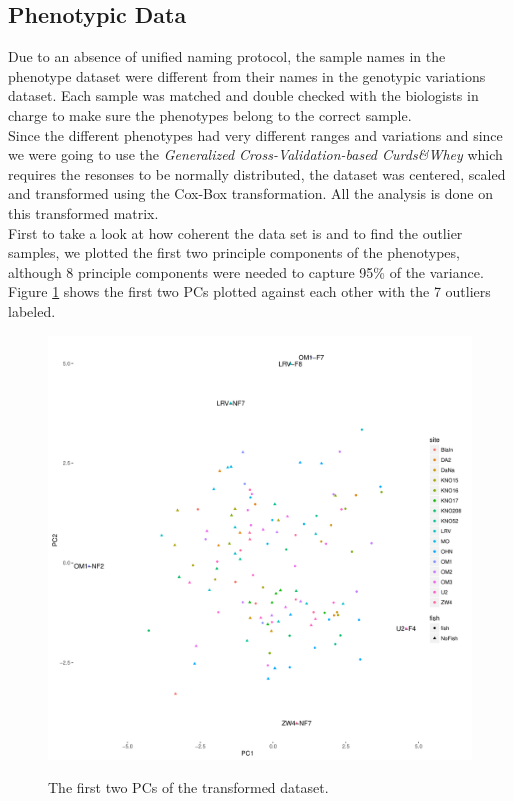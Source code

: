 \documentclass[a4paper]{article}
\begin{document}
\subsection{Phenotypic Data}

Due to an absence of unified naming protocol, the sample names in the phenotype dataset were different from their names in the genotypic variations dataset. Each sample was matched and double checked with the biologists in charge to make sure the phenotypes belong to the correct sample. \\
Since the different phenotypes had very different ranges and variations and since we were going to use the \textit{Generalized Cross-Validation-based Curds\&Whey} which requires the resonses to be normally distributed, the dataset was centered, scaled and transformed using the Cox-Box transformation. All the analysis is done on this transformed matrix.\\
First to take a look at how coherent the data set is and to find the outlier samples, we plotted the first two principle components of the phenotypes, although 8 principle components were needed to capture 95\% of the variance. Figure \ref{fig:pca} shows the first two PCs plotted against each other with the 7 outliers labeled.

\begin{figure}
\centering
\includegraphics[width = .9\textwidth]{pca.pdf}
\label{fig:pca}
\caption{The first two PCs of the transformed dataset.}
\end{figure}
\end{document}
